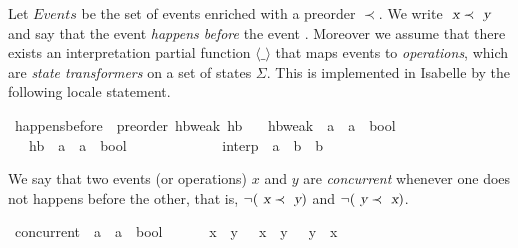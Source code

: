 \documentclass[acmlarge,review,anonymous]{acmart}\settopmatter{printfolios=true}
\begin{document}
Let $\mathit{Events}$ be the set of events enriched with a preorder $\prec$. We
write $\isa{x} \prec \isa{y}$ and say that the event  \emph{happens
before} the event .  Moreover we assume that there exists an
interpretation partial function $\langle\_\rangle$ that maps events to
\emph{operations}, which are \emph{state transformers} on a set of states
$\Sigma$.  This is implemented in Isabelle by the following locale
statement.

\begin{isabellebody}
  \isanewline
{}\isamarkupfalse%
\ happens{\isacharunderscore}before\ {\isacharequal}\ preorder\ hb{\isacharunderscore}weak\ hb\isanewline
\ \ \ hb{\isacharunderscore}weak\ {\isacharcolon}{\isacharcolon}\ {\isachardoublequoteopen}{\isacharprime}a\ {\isasymRightarrow}\ {\isacharprime}a\ {\isasymRightarrow}\ bool{\isachardoublequoteclose}\ \ {\isacharparenleft}\ {\isachardoublequoteopen}{\isasympreceq}{\isachardoublequoteclose}\ {}{}{\isacharparenright}\isanewline
\ \ \ hb\ {\isacharcolon}{\isacharcolon}\ {\isachardoublequoteopen}{\isacharprime}a\ {\isasymRightarrow}\ {\isacharprime}a\ {\isasymRightarrow}\ bool{\isachardoublequoteclose}\ \ \ \ \ \ \ {\isacharparenleft}\ {\isachardoublequoteopen}{\isasymprec}{\isachardoublequoteclose}\ {}{}{\isacharparenright}\ {\isacharplus}\isanewline
\ \ \ interp\ {\isacharcolon}{\isacharcolon}\ {\isachardoublequoteopen}{\isacharprime}a\ {\isasymRightarrow}\ {\isacharprime}b\ {\isasymrightharpoonup}\ {\isacharprime}b{\isachardoublequoteclose}\ {\isacharparenleft}{\isachardoublequoteopen}{\isasymlangle}{\isacharunderscore}{\isasymrangle}{\isachardoublequoteclose}\ {\isacharbrackleft}{}{\isacharbrackright}\ {}{}{}{}{\isacharparenright}\isanewline
\end{isabellebody}

We say that two events (or operations) $x$ and $y$ are \emph{concurrent}
whenever one does not happens before the other, that is, $\neg (\isa{x} \prec
\isa{y})$ and $\neg (\isa{y} \prec \isa{x})$.

\begin{isabellebody}
  \isanewline
{}\isamarkupfalse%
\ concurrent\ {\isacharcolon}{\isacharcolon}\ {\isachardoublequoteopen}{\isacharprime}a\ {\isasymRightarrow}\ {\isacharprime}a\ {\isasymRightarrow}\ bool{\isachardoublequoteclose}\ {\isacharparenleft}\ {\isachardoublequoteopen}{\isasymparallel}{\isachardoublequoteclose}\ {}{}{\isacharparenright}\ \isanewline
\ \ {\isachardoublequoteopen}x\ {\isasymparallel}\ y\ {\isasymequiv}\ {\isasymnot}\ {\isacharparenleft}x\ {\isasymprec}\ y{\isacharparenright}\ {\isasymand}\ {\isasymnot}\ {\isacharparenleft}y\ {\isasymprec}\ x{\isacharparenright}{\isachardoublequoteclose}\isanewline
\end{isabellebody}
\end{document}
